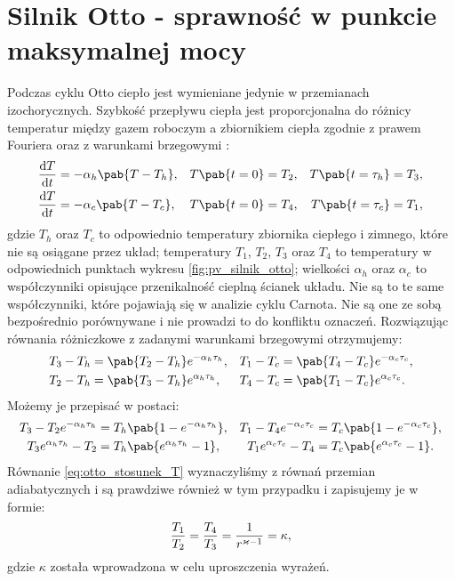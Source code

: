 
\section{Silnik Otto - sprawność w punkcie maksymalnej mocy}
Podczas cyklu Otto ciepło jest wymieniane jedynie w przemianach izochorycznych. Szybkość przepływu ciepła jest proporcjonalna do różnicy temperatur między gazem roboczym a zbiornikiem ciepła zgodnie z prawem Fouriera oraz z warunkami brzegowymi \cite{endo_otto}:
\begin{align}
	\odv{T}{t} &= -\alpha_h \pab{T - T_h}, &
	T\pab{t=0} &= T_2, &
	T\pab{t=\tau_h} &= T_3, \\
	\odv{T}{t} &= -\alpha_c \pab{T - T_c}, &
	T\pab{t=0} &= T_4, &
	T\pab{t=\tau_c} &= T_1,
\end{align}
gdzie \(T_h\) oraz \(T_c\) to odpowiednio temperatury zbiornika ciepłego i zimnego, które nie są osiągane przez układ; temperatury \(T_1\), \(T_2\), \(T_3\) oraz \(T_4\) to temperatury w odpowiednich punktach wykresu \ref{fig:pv_silnik_otto}; wielkości \(\alpha_h\) oraz \(\alpha_c\) to współczynniki opisujące przenikalność cieplną ścianek układu. Nie są to te same współczynniki, które pojawiają się w analizie cyklu Carnota. Nie są one ze sobą bezpośrednio porównywane i nie prowadzi to do konfliktu oznaczeń. Rozwiązując równania różniczkowe z zadanymi warunkami brzegowymi otrzymujemy:
\begin{equation}
\begin{aligned}
	T_3 - T_h &= \pab{T_2 - T_h} e^{-\alpha_h \tau_h}, &
	T_1 - T_c &= \pab{T_4 - T_c} e^{-\alpha_c \tau_c}, \\
	T_2 - T_h &= \pab{T_3 - T_h} e^{\alpha_h \tau_h}, &
	T_4 - T_c &= \pab{T_1 - T_c} e^{\alpha_c \tau_c}.
\end{aligned}
\end{equation}
Możemy je przepisać w postaci:
\begin{equation}\label{eq:otto_endo_T_roznice}
\begin{aligned}
	T_3 - T_2 e^{-\alpha_h \tau_h} &= T_h \pab{1 - e^{-\alpha_h \tau_h}}, &
	T_1 - T_4 e^{-\alpha_c \tau_c} &= T_c \pab{1 - e^{-\alpha_c \tau_c}}, \\
	T_3 e^{\alpha_h \tau_h} - T_2 &= T_h \pab{e^{\alpha_h \tau_h} - 1}, &
	T_1 e^{\alpha_c \tau_c} - T_4 &= T_c \pab{e^{\alpha_c \tau_c} - 1}.
\end{aligned}
\end{equation}
Równanie \eqref{eq:otto_stosunek_T} wyznaczyliśmy z równań przemian adiabatycznych i są prawdziwe również w tym przypadku i zapisujemy je w formie:
\begin{equation}\label{eq:otto_endo_stosunek_T}
	\frac{T_1}{T_2} = \frac{T_4}{T_3} = \frac{1}{r^{\varkappa-1}} = \kappa,
\end{equation}
gdzie \(\kappa\) została wprowadzona w celu uproszczenia wyrażeń.

